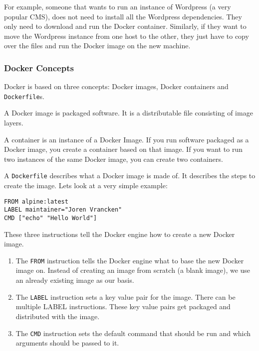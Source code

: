 For example, someone that wants to run an instance of Wordpress (a very popular CMS), does not need to install all the Wordpress dependencies. They only need to download and run the Docker container.
Similarly, if they want to move the Wordpress instance from one host to the other, they just have to copy over the files and run the Docker image on the new machine.

\subsubsection{Docker Concepts}
Docker is based on three concepts: Docker images, Docker containers and \lstinline{Dockerfile}s.

\hfill

A Docker image is packaged software. It is a distributable file consisting of image layers.

\hfill

A container is an instance of a Docker Image. If you run software packaged as a Docker image, you create a container based on that image. If you want to run two instances of the same Docker image, you can create two containers.

\hfill

A \lstinline{Dockerfile} describes what a Docker image is made of. It describes the steps to create the image. Lets look at a very simple example:
\begin{lstlisting}
FROM alpine:latest
LABEL maintainer="Joren Vrancken"
CMD ["echo" "Hello World"]
\end{lstlisting}

These three instructions tell the Docker engine how to create a new Docker image.

\begin{enumerate}
    \item The \lstinline{FROM} instruction tells the Docker engine what to base the new Docker image on. Instead of creating an image from scratch (a blank image), we use an already existing image as our basis.

    \item The \lstinline{LABEL} instruction sets a key value pair for the image. There can be multiple LABEL instructions. These key value pairs get packaged and distributed with the image.

    \item The \lstinline{CMD} instruction sets the default command that should be run and which arguments should be passed to it.
\end{enumerate}

